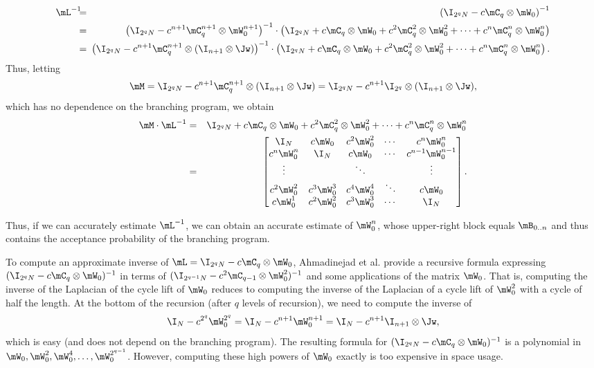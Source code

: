 \documentclass{toc}
\begin{document}
    \begin{eqnarray*}
    \mL^{-1} \!\!\! &=&\!\!\!\! \left(\I_{2^qN} - c \mC_q\otimes \mW_0\right)^{-1}\\
    &=& \!\!\! \left(\I_{2^qN} - c^{n+1} \mC_q^{n+1} \otimes \mW_0^{n+1}\right)^{-1}\cdot
    \left(\I_{2^qN} + c \mC_q\otimes \mW_0 +c^2 \mC^2_q\otimes \mW_0^2 + \cdots +
    c^n \mC^n_q\otimes \mW_0^n\right)\\
    &=& \!\!\! \left(\I_{2^qN} - c^{n+1} \mC_q^{n+1}\otimes(\I_{n+1} \otimes \Jw)\right)^{-1} \cdot 
        \left(\I_{2^qN} + c \mC_q\otimes \mW_0 +c^2 \mC^2_q\otimes \mW_0^2 + \cdots +
    c^n \mC^n_q\otimes \mW_0^n\right).  %
    \end{eqnarray*}
%
    Thus, letting $$\mM = \I_{2^qN} - c^{n+1} \mC_q^{n+1}\otimes(\I_{n+1} \otimes \Jw)= \I_{2^qN} - c^{n+1} \I_{2^q}\otimes(\I_{n+1} \otimes \Jw),$$
    which has no dependence on the branching program,
    we %
    obtain %
    \begin{eqnarray*}
    \mM\cdot \mL^{-1}
    &=& \I_{2^qN} + c \mC_q\otimes \mW_0 +c^2 \mC^2_q\otimes \mW_0^2 + \cdots + 
    c^n \mC^n_q\otimes \mW_0^n\\
    &=&
    \begin{bmatrix}
    \I_N & c\mW_0 & c^2\mW_0^2 & \cdots & c^n\mW_0^n \\
    c^n\mW_0^n & \I_N & c\mW_0 & \cdots & c^{n-1}\mW_0^{n-1} \\
    \vdots & & \ddots & & \vdots\\
    c^2\mW_0^2 & c^3\mW_0^3 & c^4\mW_0^4 & \ddots & c\mW_0\\
    c\mW_0^1 & c^2\mW_0^2 & c^3\mW_0^3 & \cdots &  \I_N \\
    \end{bmatrix}.
    \end{eqnarray*}

    Thus, if we can accurately estimate $\mL^{-1}$, we can
    obtain an accurate estimate of  $\mW_0^n$, whose upper-right block equals $\mB_{0..n}$ and thus contains the acceptance probability of the 
    branching program.
    
    To compute an approximate inverse of $\mL=\I_{2^qN} - c \mC_q \otimes \mW_0$, 
%
Ahmadinejad  %
et al. provide a recursive formula
    expressing $(\I_{2^qN} - c \mC_q \otimes \mW_0)^{-1}$ in terms of
    $(\I_{2^{q-1}N} - c^2 \mC_{q-1} \otimes \mW^2_0)^{-1}$ and some applications of the matrix $\mW_0$.
    That is, computing the inverse of the Laplacian of the cycle lift of $\mW_0$ reduces
    to computing the inverse of the Laplacian of a cycle lift of $\mW_0^2$ with a cycle of half the length.  At the bottom of the recursion (after $q$ levels of recursion), we need to compute the inverse of $$\I_N-c^{2^q}\mW_0^{2^q} = \I_N - c^{n+1}\mW_0^{n+1} = \I_N - c^{n+1} \I_{n+1}\otimes \Jw,$$
    which is easy (and does not depend on the branching program).
    The resulting formula for $(\I_{2^qN} - c \mC_q \otimes \mW_0)^{-1}$
    is a polynomial in $\mW_0,\mW_0^2,\mW_0^4,\ldots,\mW_0^{2^{q-1}}$.
    However, computing these high powers of $\mW_0$ exactly is too expensive in space usage.  
    
\end{document}
